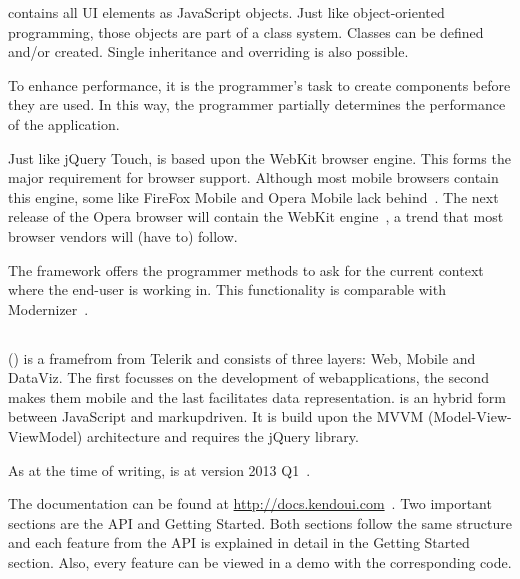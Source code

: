 \documentclass[a4paper]{artikel3}
\renewcommand{\url}[1]{\href{#1}{#1}}
\newcommand{\setspace}[0]{\vspace{2mm}}
\renewcommand{\paragraph}[1]{\setspace \noindent {\bf #1}  }
\begin{document}
\sta{} contains all UI elements as JavaScript objects.  
Just like object-oriented programming,  those objects are part of a class system.  
Classes can be defined and/or created.  
Single inheritance and overriding is also possible.    

To enhance performance,  it is the programmer's task to create components before they are used.  
In this way,  the programmer partially determines the performance of the application.

\paragraph{Browser support}
Just like jQuery Touch,  \sta{} is based upon the WebKit browser engine.  
This forms the major requirement for browser support.  
Although most mobile browsers contain this engine,  some like FireFox Mobile and Opera Mobile lack behind~\cite{JohnEClark2012}.  
The next release of the Opera browser will contain the WebKit engine~\cite{Wokke2013}, a trend that most browser vendors will (have to) follow.

The framework offers the programmer methods to ask for the current context where the end-user is working in.
This functionality is comparable with Modernizer~\cite{Modernizr2012}.  


\subsection{\kendo} %
\label{sec:frameworks-kendo}

\kendo{} (\kendob{}) is a framefrom from Telerik and consists of three layers:  \kendo{} Web,  \kendo{} Mobile and \kendo{} DataViz.
The first focusses on the development of webapplications,  the second makes them mobile and the last facilitates data representation.
\kendo{} is an hybrid form between JavaScript and markupdriven.
It is build upon the MVVM (Model-View-ViewModel) architecture and requires the jQuery library.

As at the time of writing,  \kendo{} is at version 2013 Q1~\cite{Telerik}. 

\paragraph{Documentation}
The documentation can be found at \url{http://docs.kendoui.com}~\cite{Telerikd}.
Two important sections are the API and Getting Started.
Both sections follow the same structure and each feature from the API is explained in detail in the Getting Started section.
Also,  every feature can be viewed in a demo with the corresponding code.
\end{document}
